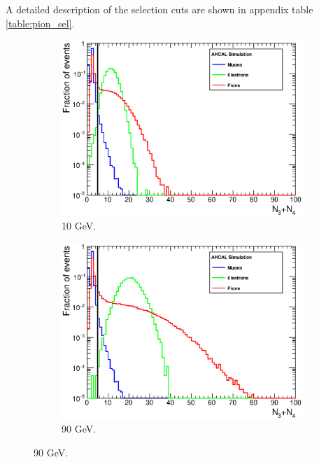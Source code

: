 A detailed description of the selection cuts are shown in appendix table \ref{table:pion_sel}.

\begin{figure}[htbp!]
	\begin{subfigure}[t]{0.49\textwidth}
		\centering
		\includegraphics[width=1\linewidth]{../Thesis_Plots/Timing/Pions/Plots/SelectionCut_N3N4_10GeV.eps}
		\caption{10 GeV.} \label{fig:pi10GeV_N3N4}
	\end{subfigure}
	\hfill
	\begin{subfigure}[t]{0.49\textwidth}
		\centering
		\includegraphics[width=1\linewidth]{../Thesis_Plots/Timing/Pions/Plots/SelectionCut_N3N4_90GeV.eps}
		\caption{90 GeV.} \label{fig:pi90GeV_N3N4}
	\end{subfigure}

\end{figure}
